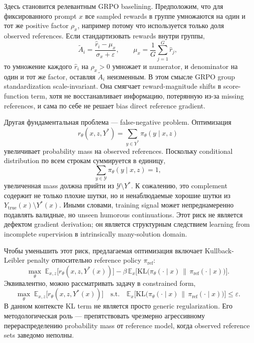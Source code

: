 Здесь становится релевантным GRPO baselining. Предположим, что для фиксированного prompt \(x\) все sampled rewards в группе умножаются на один и тот же positive factor \(\rho_x\), например потому что используется только доля observed references. Если стандартизовать rewards внутри группы,
\[
    \widetilde A_i
    =
    \frac{\hat r_i - \mu_x}{\sigma_x+\varepsilon},
    \qquad
    \mu_x=\frac{1}{G}\sum_{j=1}^{G}\hat r_j,
\]
то умножение каждого \(\hat r_i\) на \(\rho_x>0\) умножает и numerator, и denominator на один и тот же factor, оставляя \(\widetilde A_i\) неизменным. В этом смысле GRPO group standardization scale-invariant. Она смягчает reward-magnitude shifts в score-function term, хотя не восстанавливает информацию, потерянную из-за missing references, и сама по себе не решает bias direct reference gradient.

Другая фундаментальная проблема --- false-negative problem. Оптимизация
\[
    r_{\theta}(x,z,Y^{*})=\sum_{y\in Y^{*}}\pi_{\theta}(y\mid x,z)
\]
увеличивает probability mass на observed references. Поскольку conditional distribution по всем строкам суммируется в единицу,
\[
    \sum_{y\in\mathcal{Y}}\pi_{\theta}(y\mid x,z)=1,
\]
увеличенная mass должна прийти из \(\mathcal{Y}\setminus Y^{*}\). К сожалению, это complement содержит не только плохие шутки, но и ненаблюдаемые хорошие шутки из \(Y_{\mathrm{true}}(x)\setminus Y^{*}(x)\). Иными словами, training signal может непреднамеренно подавлять валидные, но unseen humorous continuations. Этот риск не является дефектом gradient derivation; он является структурным следствием learning from incomplete supervision в intrinsically many-solution domain.

Чтобы уменьшить этот риск, предлагаемая оптимизация включает Kullback-Leibler penalty относительно reference policy \(\pi_{\mathrm{ref}}\):
\[
    \max_{\theta}
    \;
    \mathbb{E}_{x,z}\big[r_{\theta}(x,z,Y^{*}(x))\big]
    -
    \beta\,
    \mathbb{E}_{x}\Big[
        \mathrm{KL}\big(
        \pi_{\theta}(\cdot\mid x)\,\|\,\pi_{\mathrm{ref}}(\cdot\mid x)
        \big)
        \Big].
\]
Эквивалентно, можно рассматривать задачу в constrained form,
\[
    \max_{\theta}\;
    \mathbb{E}_{x,z}\big[r_{\theta}(x,z,Y^{*}(x))\big]
    \quad
    \text{s.t.}
    \quad
    \mathbb{E}_{x}
    \Big[
        \mathrm{KL}\big(
        \pi_{\theta}(\cdot\mid x)\,\|\,\pi_{\mathrm{ref}}(\cdot\mid x)
        \big)
        \Big]
    \le \varepsilon.
\]
В данном контексте KL term не является просто generic regularization. Его методологическая роль --- препятствовать чрезмерно агрессивному перераспределению probability mass от reference model, когда observed reference sets заведомо неполны.

